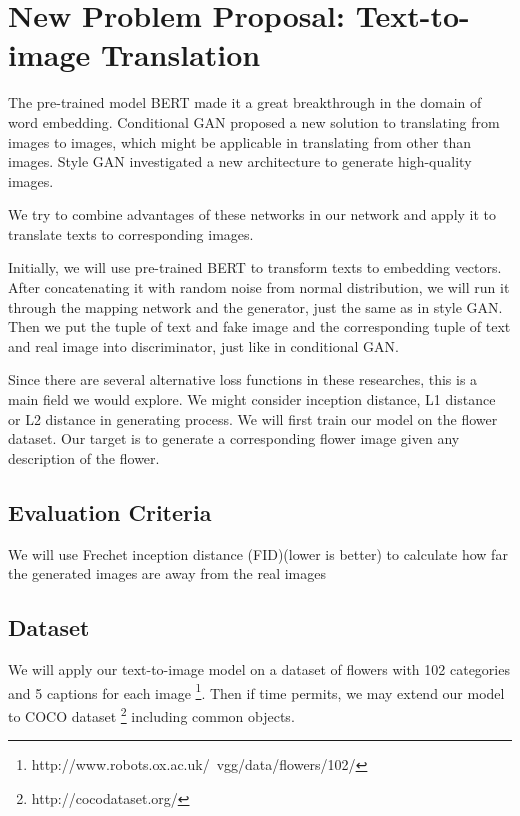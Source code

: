 \documentclass{article}
\begin{document}
\section{New Problem Proposal: Text-to-image Translation}
The pre-trained model BERT\cite{bert} made it a great breakthrough in the domain of word embedding. Conditional GAN\cite{cgan} proposed a new solution to translating from images to images, which might be applicable in translating from other than images. Style GAN\cite{stylegan} investigated a new architecture to generate high-quality images.

We try to combine advantages of these networks in our network and apply it to translate texts to corresponding images.

Initially, we will use pre-trained BERT\cite{bert} to transform texts to embedding vectors. After concatenating it with random noise from normal distribution, we will run it through the mapping network and the generator, just the same as in style GAN\cite{stylegan}. Then we put the tuple of text and fake image and the corresponding tuple of text and real image into discriminator, just like in conditional GAN.

Since there are several alternative loss functions in these researches, this is a main field we would explore. We might consider inception distance, L1 distance or L2 distance in generating process. We will first train our model on the flower dataset. Our target is to generate a corresponding flower image given any description of the flower.

\subsection{Evaluation Criteria}

We will use Frechet inception distance (FID)\cite{fid}(lower is better) to calculate how far the generated images are away from the real images

\subsection{Dataset}
We will apply our text-to-image model on a dataset of flowers with 102 categories and 5 captions for each image \footnote{http://www.robots.ox.ac.uk/~vgg/data/flowers/102/}. Then if time permits, we may extend our model to COCO dataset \footnote{http://cocodataset.org/} including common objects.


\newpage

\nocite{langley00}
\end{document}
